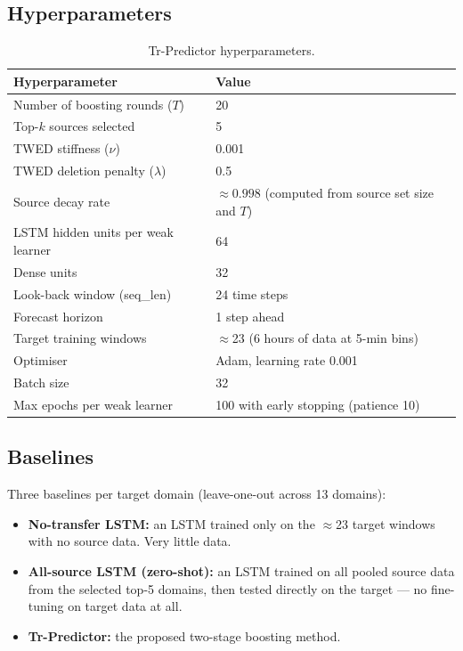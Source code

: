 \documentclass[12pt,a4paper]{article}
\begin{document}
\subsection{Hyperparameters}

\begin{table}[H]
\centering
\small
\caption{Tr-Predictor hyperparameters.}
\begin{tabular}{@{}ll@{}}
\toprule
\textbf{Hyperparameter} & \textbf{Value} \\
\midrule
Number of boosting rounds ($T$) & 20 \\
Top-$k$ sources selected & 5 \\
TWED stiffness ($\nu$) & 0.001 \\
TWED deletion penalty ($\lambda$) & 0.5 \\
Source decay rate & $\approx 0.998$ (computed from source set size and $T$) \\
LSTM hidden units per weak learner & 64 \\
Dense units & 32 \\
Look-back window (seq\_len) & 24 time steps \\
Forecast horizon & 1 step ahead \\
Target training windows & $\approx$23 (6 hours of data at 5-min bins) \\
Optimiser & Adam, learning rate 0.001 \\
Batch size & 32 \\
Max epochs per weak learner & 100 with early stopping (patience 10) \\
\bottomrule
\end{tabular}
\end{table}

\subsection{Baselines}

Three baselines per target domain (leave-one-out across 13 domains):

\begin{itemize}
  \item \textbf{No-transfer LSTM:} an LSTM trained only on the $\approx$23
        target windows with no source data. Very little data.
  \item \textbf{All-source LSTM (zero-shot):} an LSTM trained on all
        pooled source data from the selected top-5 domains, then tested
        directly on the target --- no fine-tuning on target data at all.
  \item \textbf{Tr-Predictor:} the proposed two-stage boosting method.
\end{itemize}
\end{document}
